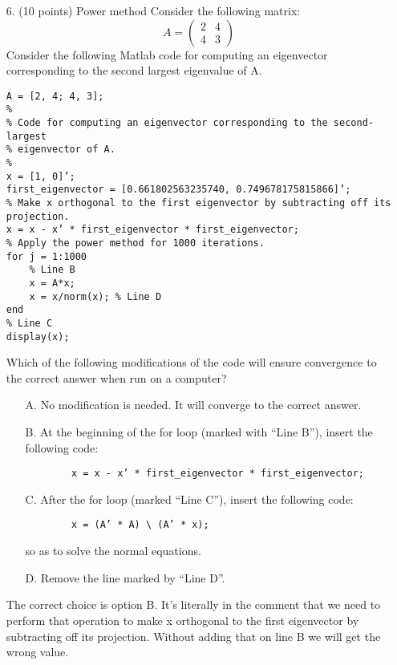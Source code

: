 \documentclass{article}
\begin{document}
\begin{enumerate}
    \newpage
    \item[6.] (10 points) Power method \newline
    Consider the following matrix:
    \[A = \begin{pmatrix}2 & 4 \\ 4 & 3\end{pmatrix}\]
    Consider the following Matlab code for computing an eigenvector corresponding to the second largest eigenvalue of A.
    \begin{verbatim}
A = [2, 4; 4, 3];
%
% Code for computing an eigenvector corresponding to the second-largest
% eigenvector of A.
%
x = [1, 0]’;
first_eigenvector = [0.661802563235740, 0.749678175815866]’;
% Make x orthogonal to the first eigenvector by subtracting off its projection.
x = x - x’ * first_eigenvector * first_eigenvector;
% Apply the power method for 1000 iterations.
for j = 1:1000
    % Line B
    x = A*x;
    x = x/norm(x); % Line D
end
% Line C
display(x);
    \end{verbatim}
    Which of the following modifications of the code will ensure convergence to the correct answer
    when run on a computer?
    \begin{enumerate}
        \item[A.] No modification is needed. It will converge to the correct answer.
        \item[B.] At the beginning of the for loop (marked with “Line B”), insert the following code:
        \begin{verbatim}
        x = x - x’ * first_eigenvector * first_eigenvector;
        \end{verbatim}
        \item[C.] After the for loop (marked “Line C”), insert the following code:
        \begin{verbatim}
        x = (A’ * A) \ (A’ * x);
        \end{verbatim}
        so as to solve the normal equations.
        \item[D.] Remove the line marked by “Line D”.
    \end{enumerate}
    The correct choice is option B. It's literally in the comment that we need to perform that operation to make x orthogonal to the first eigenvector by subtracting off its projection. Without adding that on line B we will get the wrong value.
    

\end{enumerate}
\end{document}
